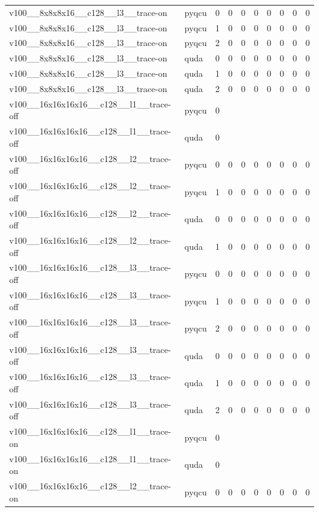 \begin{table}[htbp]
\begin{tabular}{@{}llrrrrrrrr@{}}
v100\_\_8x8x8x16\_\_c128\_\_l3\_\_trace-on & pyqcu & 0 & 0 & 0 & 0 & 0 & 0 & 0 & 0 \\
v100\_\_8x8x8x16\_\_c128\_\_l3\_\_trace-on & pyqcu & 1 & 0 & 0 & 0 & 0 & 0 & 0 & 0 \\
v100\_\_8x8x8x16\_\_c128\_\_l3\_\_trace-on & pyqcu & 2 & 0 & 0 & 0 & 0 & 0 & 0 & 0 \\
v100\_\_8x8x8x16\_\_c128\_\_l3\_\_trace-on & quda & 0 & 0 & 0 & 0 & 0 & 0 & 0 & 0 \\
v100\_\_8x8x8x16\_\_c128\_\_l3\_\_trace-on & quda & 1 & 0 & 0 & 0 & 0 & 0 & 0 & 0 \\
v100\_\_8x8x8x16\_\_c128\_\_l3\_\_trace-on & quda & 2 & 0 & 0 & 0 & 0 & 0 & 0 & 0 \\
v100\_\_16x16x16x16\_\_c128\_\_l1\_\_trace-off & pyqcu & 0 &  &  &  &  &  &  &  \\
v100\_\_16x16x16x16\_\_c128\_\_l1\_\_trace-off & quda & 0 &  &  &  &  &  &  &  \\
v100\_\_16x16x16x16\_\_c128\_\_l2\_\_trace-off & pyqcu & 0 & 0 & 0 & 0 & 0 & 0 & 0 & 0 \\
v100\_\_16x16x16x16\_\_c128\_\_l2\_\_trace-off & pyqcu & 1 & 0 & 0 & 0 & 0 & 0 & 0 & 0 \\
v100\_\_16x16x16x16\_\_c128\_\_l2\_\_trace-off & quda & 0 & 0 & 0 & 0 & 0 & 0 & 0 & 0 \\
v100\_\_16x16x16x16\_\_c128\_\_l2\_\_trace-off & quda & 1 & 0 & 0 & 0 & 0 & 0 & 0 & 0 \\
v100\_\_16x16x16x16\_\_c128\_\_l3\_\_trace-off & pyqcu & 0 & 0 & 0 & 0 & 0 & 0 & 0 & 0 \\
v100\_\_16x16x16x16\_\_c128\_\_l3\_\_trace-off & pyqcu & 1 & 0 & 0 & 0 & 0 & 0 & 0 & 0 \\
v100\_\_16x16x16x16\_\_c128\_\_l3\_\_trace-off & pyqcu & 2 & 0 & 0 & 0 & 0 & 0 & 0 & 0 \\
v100\_\_16x16x16x16\_\_c128\_\_l3\_\_trace-off & quda & 0 & 0 & 0 & 0 & 0 & 0 & 0 & 0 \\
v100\_\_16x16x16x16\_\_c128\_\_l3\_\_trace-off & quda & 1 & 0 & 0 & 0 & 0 & 0 & 0 & 0 \\
v100\_\_16x16x16x16\_\_c128\_\_l3\_\_trace-off & quda & 2 & 0 & 0 & 0 & 0 & 0 & 0 & 0 \\
v100\_\_16x16x16x16\_\_c128\_\_l1\_\_trace-on & pyqcu & 0 &  &  &  &  &  &  &  \\
v100\_\_16x16x16x16\_\_c128\_\_l1\_\_trace-on & quda & 0 &  &  &  &  &  &  &  \\
v100\_\_16x16x16x16\_\_c128\_\_l2\_\_trace-on & pyqcu & 0 & 0 & 0 & 0 & 0 & 0 & 0 & 0 \\

\end{tabular}
\end{table}
